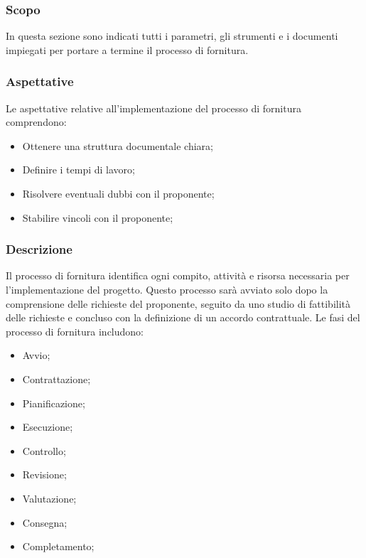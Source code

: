 \documentclass{article}
\begin{document}
\subsubsection{Scopo}
In questa sezione sono indicati tutti i parametri, gli strumenti e i documenti impiegati per portare a termine il processo di fornitura.

\subsubsection{Aspettative}
Le aspettative relative all'implementazione del processo di fornitura comprendono:
\begin{itemize}
    \item Ottenere una struttura documentale chiara;
    \item Definire i tempi di lavoro;
    \item Risolvere eventuali dubbi con il proponente;
    \item Stabilire vincoli con il proponente;
\end{itemize}

\subsubsection{Descrizione}
Il processo di fornitura identifica ogni compito, attività e risorsa necessaria per l'implementazione del progetto. Questo processo sarà avviato solo dopo la comprensione delle richieste del proponente, seguito da uno studio di fattibilità delle richieste e concluso con la definizione di un accordo contrattuale. Le fasi del processo di fornitura includono:
\begin{itemize}
    \item Avvio;
    \item Contrattazione;
    \item Pianificazione;
    \item Esecuzione;
    \item Controllo;
    \item Revisione;
    \item Valutazione;
    \item Consegna;
    \item Completamento;
\end{itemize}
\end{document}
